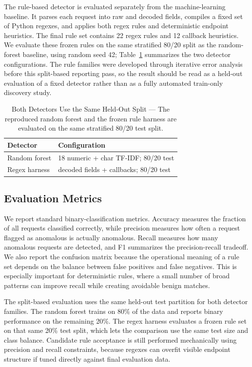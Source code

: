 \documentclass[letterpaper,twocolumn,10pt]{article}
\begin{document}
The rule-based detector is evaluated separately from the machine-learning baseline. It parses each request into raw and decoded fields, compiles a fixed set of Python regexes, and applies both regex rules and deterministic endpoint heuristics. The final rule set contains 22 regex rules and 12 callback heuristics. We evaluate these frozen rules on the same stratified 80/20 split as the random-forest baseline, using random seed 42; Table~\ref{tab:experimental-configs} summarizes the two detector configurations. The rule families were developed through iterative error analysis before this split-based reporting pass, so the result should be read as a held-out evaluation of a fixed detector rather than as a fully automated train-only discovery study.

\begin{table}[t]
\centering
\begin{tabular}{lp{1.95in}}
\toprule
Detector & Configuration \\
\midrule
Random forest & 18 numeric + char TF-IDF; 80/20 test \\
Regex harness & decoded fields + callbacks; 80/20 test \\
\bottomrule
\end{tabular}
\caption{Both Detectors Use the Same Held-Out Split --- The reproduced random forest and the frozen rule harness are evaluated on the same stratified 80/20 test split.}
\label{tab:experimental-configs}
\end{table}

\subsection{Evaluation Metrics}

We report standard binary-classification metrics. Accuracy measures the fraction of all requests classified correctly, while precision measures how often a request flagged as anomalous is actually anomalous. Recall measures how many anomalous requests are detected, and F1 summarizes the precision-recall tradeoff. We also report the confusion matrix because the operational meaning of a rule set depends on the balance between false positives and false negatives. This is especially important for deterministic rules, where a small number of broad patterns can improve recall while creating avoidable benign matches.

The split-based evaluation uses the same held-out test partition for both detector families. The random forest trains on 80\% of the data and reports binary performance on the remaining 20\%. The regex harness evaluates a frozen rule set on that same 20\% test split, which lets the comparison use the same test size and class balance. Candidate rule acceptance is still performed mechanically using precision and recall constraints, because regexes can overfit visible endpoint structure if tuned directly against final evaluation data.
\end{document}
